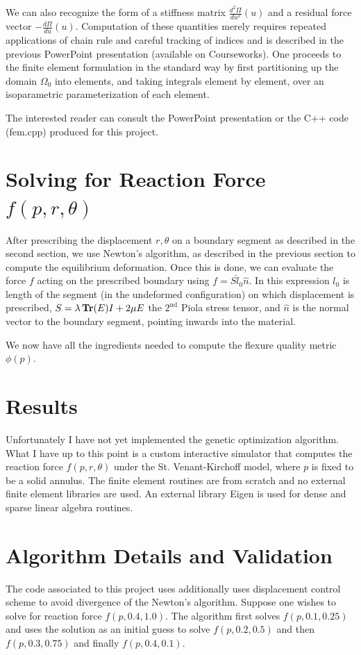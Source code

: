 \documentclass[11pt,letterpaper]{article}
\begin{document}
We can also recognize the form of a stiffness matrix $\frac{d^2\Pi}{du^2}(u)$ and a residual force vector $-\frac{d\Pi}{du} (u)$. Computation of these quantities merely requires repeated applications of chain rule and careful tracking of indices and is described in the previous PowerPoint presentation (available on Courseworks). One proceeds to the finite element formulation in the standard way by first partitioning up the domain $\Omega_0$ into elements, and taking integrals element by element, over an isoparametric parameterization of each element.

The interested reader can consult the PowerPoint presentation or the C++ code (fem.cpp) \cite{github} produced for this project.

\section {Solving for Reaction Force $f(p, r, \theta)$}
After prescribing the displacement $r, \theta$ on a boundary segment as described in the second section, we use Newton's algorithm, as described in the previous section to compute the equilibrium deformation. Once this is done, we can evaluate the force $f$ acting on the prescribed boundary using $f = S \hat l_0 \hat n$. In this expression $l_0$ is length of the segment (in the undeformed configuration) on which displacement is prescribed, $S = \lambda \mathop{\bf Tr}(E) I + 2 \mu E$ the $2^\text{nd}$ Piola stress tensor, and $\hat n$ is the normal vector to the boundary segment, pointing inwards into the material.

We now have all the ingredients needed to compute the flexure quality metric $\phi(p)$.

\section{Results}
Unfortunately I have not yet implemented the genetic optimization algorithm. What I have up to this point is a custom interactive simulator that computes the reaction force $f(p, r, \theta)$ under the St. Venant-Kirchoff model, where $p$ is fixed to be a solid annulus. The finite element routines are from scratch and no external finite element libraries are used. An external library Eigen is used for dense and sparse linear algebra routines.

\section{Algorithm Details and Validation}
The code associated to this project \cite{github} uses additionally uses displacement control scheme to avoid divergence of the Newton's algorithm. Suppose one wishes to solve for reaction force $f(p, 0.4, 1.0)$. The algorithm first solves $f(p, 0.1, 0.25)$ and uses the solution as an initial guess to solve $f(p, 0.2, 0.5)$ and then $f(p, 0.3, 0.75)$ and finally $f(p, 0.4, 0.1)$.
\end{document}
